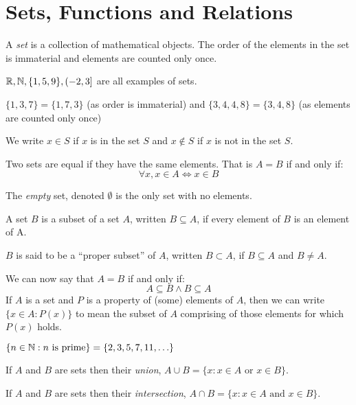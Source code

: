 \documentclass[../main.tex]{subfiles}
\begin{document}
\chapter{Sets, Functions and Relations}

\begin{definition}[Set]
  A \textit{set} is a collection of mathematical objects. The order of the elements in the set is immaterial and elements are counted only once.
\end{definition}
\begin{example}
  $\mathbb{R}, \mathbb{N}, \{1, 5, 9\}, (-2, 3]$ are all examples of sets.
\end{example}
\begin{example}
  $\{1, 3, 7\} = \{1, 7, 3\}$ (as order is immaterial) and $\{3, 4, 4, 8\} = \{3, 4, 8\}$ (as elements are counted only once)
\end{example}
\begin{remark}[Notation]
  We write $x \in S$ if $x$ is in the set $S$ and $x \notin S$ if $x$ is not in the set $S$.
\end{remark}
Two sets are equal if they have the same elements.
That is $A = B$ if and only if:
\[
  \forall x, x \in A \iff x \in B
\]
\begin{definition}
  The \textit{empty} set, denoted $\emptyset$ is the only set with no elements.
\end{definition}
\begin{definition}[Subset]
A set $B$ is a subset of a set $A$, written $B \subseteq A$, if every element of $B$ is an element of A.

$B$ is said to be a ``proper subset'' of $A$, written $B \subset A$, if $B \subseteq A$ and $B \neq A$.
\end{definition}
We can now say that $A = B$ if and only if:
\[
  A \subseteq B \land B \subseteq A
\]
If $A$ is a set and $P$ is a property of (some) elements of $A$, then we can write $\{x \in A: P(x)\}$ to mean the subset of $A$ comprising of those elements for which $P(x)$ holds.
\begin{example}
  $\{n \in \mathbb{N} : n \text{ is prime}\} = \{2, 3, 5, 7, 11, \ldots\}$
\end{example}
\begin{definition}[Union]
  If $A$ and $B$ are sets then their \textit{union}, $A \cup B = \{x: x \in A \text{ or } x \in B\}$.
\end{definition}
\begin{definition}[Intersection]
  If $A$ and $B$ are sets then their \textit{intersection}, $A \cap B = \{x: x \in A \text{ and } x \in B\}$.
\end{definition}
\end{document}
